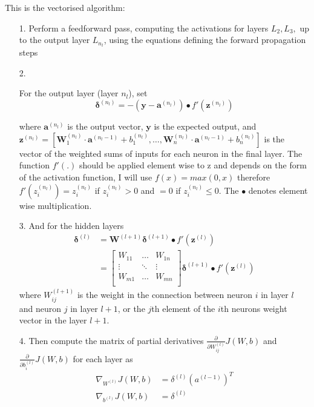 \documentclass[11pt]{article} %
\begin{document}
This is the vectorised algorithm:
\begin{itemize}

\item[1.]{Perform a feedforward pass, computing the activations for layers $L_2, L_3,$ up to the output layer $L_{n_l}$, using the equations defining the forward propagation steps}

\item[2.]{For the output layer (layer $n_l$), set
\begin{equation}
\boldsymbol \delta^{(n_l)} = - (\boldsymbol y - \boldsymbol a^{(n_l)}) \bullet f'(\boldsymbol z^{(n_l)})
\end{equation}

 where $\boldsymbol a^{(n_l)} $ is the output vector, $\boldsymbol y$ is the expected output, and $\boldsymbol z^{(n_l)} = [\boldsymbol W^{(n_l)}_1\cdot \boldsymbol a^{(n_l-1)} +b^{(n_l)}_1,\hdots,\boldsymbol W^{(n_l)}_n\cdot \boldsymbol a^{(n_l-1)} +b^{(n_l)}_n]$ is the vector of the weighted sums of inputs for each neuron in the final layer. The function $f'(.)$ should be applied element wise to z and depends on the form of the activation function, I will use  $f(x) = max(0, x)$ therefore  $f'( z_i^{(n_l)}) =  z_i^{(n_l)}$ if $ z_i^{(n_l)}>0$ and $=0$ if $ z_i^{(n_l)}\leq 0$. The $\bullet$ denotes element wise multiplication. }

\item[3.]{And for the hidden layers
\begin{align}
\boldsymbol \delta^{(l)} &= \boldsymbol W^{(l+1)}\boldsymbol \delta^{(l+1)}  \bullet f'(\boldsymbol z^{(l)}) \\
&=\begin{bmatrix}
W_{11} &\hdots&W_{1n}\\ 
\vdots &\ddots&\vdots \\
W_{m1} &\hdots&W_{mn}\\ 
\end{bmatrix}
\boldsymbol \delta^{(l+1)}  \bullet f'(\boldsymbol z^{(l)})
\end{align}
where $W^{(l+1)}_{ij}$ is the weight in the connection between neuron $i$ in layer $l$ and neuron $j$ in layer $l+1$, or the $j$th element of the $i$th neurons weight vector in the layer $l+1$. }

\item[4.]{Then compute the matrix of partial derivatives  $\frac{\partial}{\partial W_{ij}^{(l)}} J(W,b)$ and $\frac{\partial}{\partial b_{i}^{(l)}} J(W,b)$ for each layer as
\begin{align}
\nabla_{W^{(l)}} J(W,b) &= \delta^{(l)} (a^{(l-1)})^T \\
\nabla_{b^{(l)}} J(W,b) &= \delta^{(l)}
\end{align}
}
\end{itemize}
\end{document}
